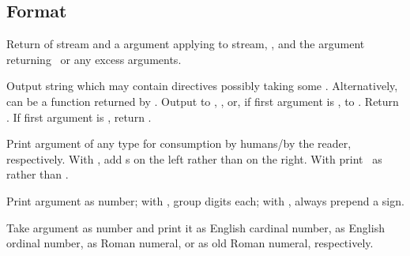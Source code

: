 \subsection{Format}
\label{section:Format}

\begin{LIST}{1cm}

  {
  Return  of stream and a  argument applying  to
  stream, , and the  argument
  returning \NIL\ or any excess arguments. 
  }

  {
  Output string  which may
  contain \kwd{\TLD} directives possibly taking some
  . Alternatively,  can be a function returned
  by .
  Output to , , or, if first
  argument is \T, to . Return \retval{\NIL}. If
  first argument is \NIL, return . 
  }

  \begin{LIST}{.5cm}

    {
    Print argument of any type for consumption by humans/by the
    reader, respectively. With , add s on the left
    rather than on the right. With \kwd{:} print \NIL\ as \LIT{()} rather
    than .
  }

    {
    Print argument as number; with \KWD{:}, group digits 
     each; with , always prepend a sign.
  }

    {
    Take argument as number and print it as English cardinal number,
    as English ordinal number, as Roman numeral, or as old Roman
    numeral, respectively.
  }


\end{LIST}
\end{LIST}
